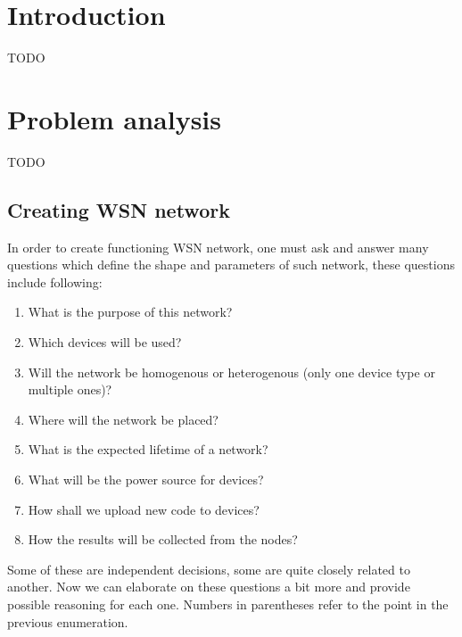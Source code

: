 \documentclass[
  print, %
  table,   %
  nolof,     %
  nolot,     %
           oneside
]{fithesis3}
\begin{document}

\chapter{Introduction}

TODO
\chapter{Problem analysis}
  TODO
  \section{Creating WSN network}
  In order to create functioning WSN network, one must ask and answer many questions which define the shape and parameters of such network, these questions include following:

  \begin{enumerate}

    \item \label{enu:purpose}What is the purpose of this network?
    \item \label{enu:devices}Which devices will be used?
    \item \label{enu:type}Will the network be homogenous or heterogenous (only one device type or multiple ones)?
    \item \label{enu:place}Where will the network be placed?
    \item \label{enu:life}What is the expected lifetime of a network?
    \item \label{enu:power}What will be the power source for devices?
    \item \label{enu:upload}How shall we upload new code to devices?
    \item \label{enu:data}How the results will be collected from the nodes?

  \end{enumerate}

  Some of these are independent decisions, some are quite closely related to another. Now we can elaborate on these questions a bit more and provide possible reasoning for each one. Numbers in parentheses refer to the point in the previous enumeration.
\end{document}
